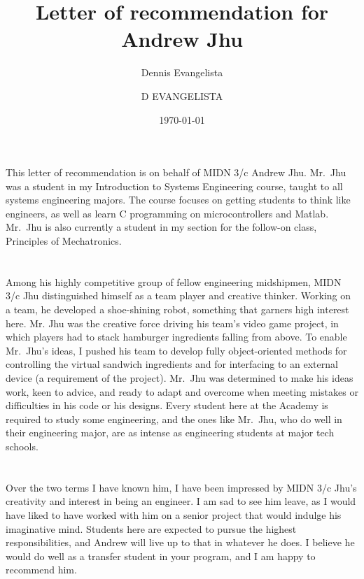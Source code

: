 \documentclass[12pt,courier]{navyletter}
\author{Dennis Evangelista}
\title{Letter of recommendation for Andrew Jhu}
\date{\today}
\begin{document}
\makedateblock{}
\begin{navyletterheader}
\navyskip{}%
\navysubjline%
\end{navyletterheader}

\section{}
This letter of recommendation is on behalf of MIDN 3/c Andrew Jhu.  Mr.~Jhu was a student in my Introduction to Systems Engineering course, taught to all systems engineering majors. The course focuses on getting students to think like engineers, as well as learn C programming on microcontrollers and Matlab.  Mr.~Jhu is also currently a student in my section for the follow-on class, Principles of Mechatronics.  

\section{} 
Among his highly competitive group of fellow engineering midshipmen, MIDN 3/c Jhu distinguished himself as a team player and creative thinker.  Working on a team, he developed a shoe-shining robot, something that garners high interest here.  Mr. Jhu was the creative force driving his team's video game project, in which players had to stack hamburger ingredients falling from above.  To enable Mr.~Jhu's ideas, I pushed his team to develop fully object-oriented methods for controlling the virtual sandwich ingredients and for interfacing to an external device (a requirement of the project).  Mr.~Jhu was determined to make his ideas work, keen to advice, and ready to adapt and overcome when meeting mistakes or difficulties in his code or his designs.  Every student here at the Academy is required to study some engineering, and the ones like Mr.~Jhu, who do well in their engineering major, are as intense as engineering students at major tech schools.  

\section{}
Over the two terms I have known him, I have been impressed by MIDN 3/c Jhu's creativity and interest in being an engineer.  I am sad to see him leave, as I would have liked to have worked with him on a senior project that would indulge his imaginative mind.  Students here are expected to pursue the highest responsibilities, and Andrew will live up to that in whatever he does.  I believe he would do well as a transfer student in your program, and I am happy to recommend him.  
\\
\noindent\hspace*{4in}
\signature{D EVANGELISTA}
\end{document}
